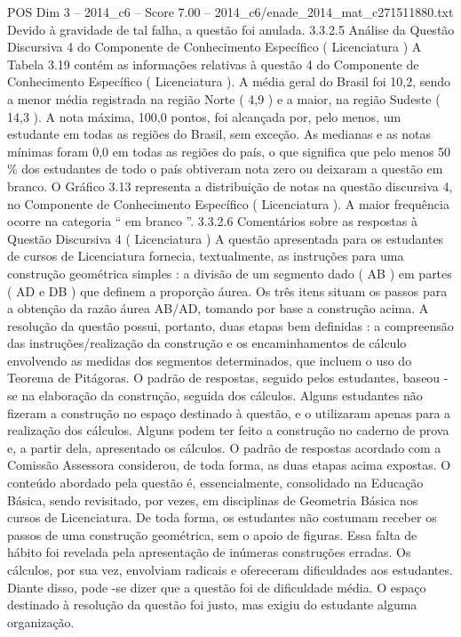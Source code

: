 \begin{textsample}{POS Dim 3 – 2014\_c6 – Score 7.00 – 2014\_c6/enade\_2014\_mat\_c271511880.txt}
Devido à gravidade de tal falha, a questão foi anulada. 3.3.2.5 Análise da Questão Discursiva 4 do Componente de Conhecimento Específico ( Licenciatura ) A Tabela 3.19 contém as informações relativas à questão 4 do Componente de Conhecimento Específico ( Licenciatura ).
A média geral do Brasil foi 10,2, sendo a menor média registrada na região Norte ( 4,9 ) e a maior, na região Sudeste ( 14,3 ).
A nota máxima, 100,0 pontos, foi alcançada por, pelo menos, um estudante em todas as regiões do Brasil, sem exceção.
As medianas e as notas mínimas foram 0,0 em todas as regiões do país, o que significa que pelo menos 50 \% dos estudantes de todo o país obtiveram nota zero ou deixaram a questão em branco.
O Gráfico 3.13 representa a distribuição de notas na questão discursiva 4, no Componente de Conhecimento Específico ( Licenciatura ).
A maior frequência ocorre na categoria “ em branco ”. 3.3.2.6 Comentários sobre as respostas à Questão Discursiva 4 ( Licenciatura ) A questão apresentada para os estudantes de cursos de Licenciatura fornecia, textualmente, as instruções para uma construção geométrica simples : a divisão de um segmento dado ( AB ) em partes ( AD e DB ) que definem a proporção áurea.
Os três itens situam os passos para a obtenção da razão áurea AB/AD, tomando por base a construção acima.
A resolução da questão possui, portanto, duas etapas bem definidas : a compreensão das instruções/realização da construção e os encaminhamentos de cálculo envolvendo as medidas dos segmentos determinados, que incluem o uso do Teorema de Pitágoras.
O padrão de respostas, seguido pelos estudantes, baseou -se na elaboração da construção, seguida dos cálculos.
Alguns estudantes não fizeram a construção no espaço destinado à questão, e o utilizaram apenas para a realização dos cálculos.
Alguns podem ter feito a construção no caderno de prova e, a partir dela, apresentado os cálculos.
O padrão de respostas acordado com a Comissão Assessora considerou, de toda forma, as duas etapas acima expostas.
O conteúdo abordado pela questão é, essencialmente, consolidado na Educação Básica, sendo revisitado, por vezes, em disciplinas de Geometria Básica nos cursos de Licenciatura.
De toda forma, os estudantes não costumam receber os passos de uma construção geométrica, sem o apoio de figuras.
Essa falta de hábito foi revelada pela apresentação de inúmeras construções erradas.
Os cálculos, por sua vez, envolviam radicais e ofereceram dificuldades aos estudantes.
Diante disso, pode -se dizer que a questão foi de dificuldade média.
O espaço destinado à resolução da questão foi justo, mas exigiu do estudante alguma organização.

\end{textsample}
